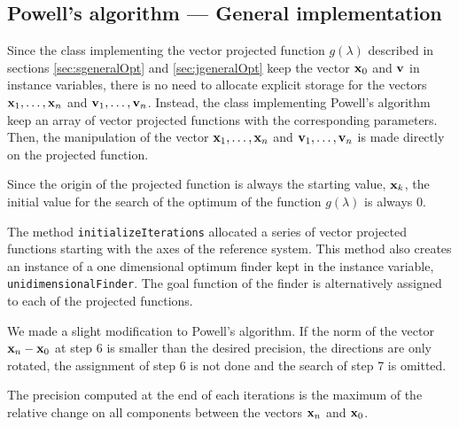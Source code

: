 \documentclass[twoside]{book}
\begin{document}
\subsection{Powell's algorithm --- General implementation}
Since the class implementing the vector projected function
$g\left(\lambda\right)$ described in sections
\ref{sec:sgeneralOpt} and \ref{sec:jgeneralOpt} keep the vector
${\bf x}_0$ and ${\bf v}$ in instance variables, there is no need
to allocate explicit storage for the vectors ${\bf
x}_1,\ldots,{\bf x}_n$ and ${\bf v}_1,\ldots,{\bf v}_n$. Instead,
the class implementing Powell's algorithm keep an array of vector
projected functions with the corresponding parameters. Then, the
manipulation of the vector ${\bf x}_1,\ldots,{\bf x}_n$ and ${\bf
v}_1,\ldots,{\bf v}_n$ is made directly on the projected function.

Since the origin of the projected function is always the starting
value, ${\bf x}_k$, the initial value for the search of the
optimum of the function $g\left(\lambda\right)$ is always 0.

The method {\tt initializeIterations} allocated a series of vector
projected functions starting with the axes of the reference
system. This method also creates an instance of a one dimensional
optimum finder kept in the instance variable, {\tt
unidimensionalFinder}. The goal function of the finder is
alternatively assigned to each of the projected functions.

We made a slight modification to Powell's algorithm. If the norm
of the vector ${\bf x}_n-{\bf x}_0$ at step 6 is smaller than the
desired precision, the directions are only rotated, the assignment
of step 6 is not done and the search of step 7 is omitted.

The precision computed  at the end of each iterations is the
maximum of the relative change on all components between the
vectors ${\bf x}_n$ and ${\bf x}_0$.
\end{document}
